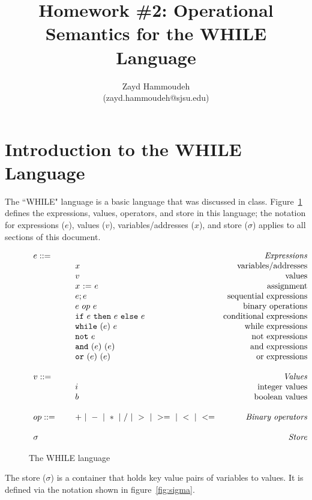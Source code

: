 \documentclass{article}
\title{Homework \#2: Operational Semantics for the WHILE Language}
\author{
  Zayd Hammoudeh \\
  (zayd.hammoudeh@sjsu.edu)
  }
\date{}
\newcommand{\rel}[1]{ \mbox{\sc [#1]} }
\newcommand{\mydefhead}[2]{\multicolumn{2}{l}{{#1}}&\mbox{\emph{#2}}\\}
\newcommand{\mydefcase}[2]{\qquad\qquad& #1 &\mbox{#2}\\}
\newcommand{\assign}[2]{#1~{:=}~#2}
\newcommand{\ife}[3]{\mbox{\tt if}~{#1}~\mbox{\tt then}~{#2}~\mbox{\tt else}~{#3}}
\newcommand{\whilee}[2]{\mbox{\tt while}~(#1)~#2}
\newcommand{\note}[1]{\mbox{\tt not}~#1}
\newcommand{\ande}[2]{\mbox{\tt and}~(#1)~(#2)}
\newcommand{\ore}[2]{\mbox{\tt or}~(#1)~(#2)}
\begin{document}
\maketitle

\section{Introduction to the WHILE Language}

The ``WHILE" language is a basic language that was discussed in class.  Figure~\ref{fig:lang} defines the expressions, values, operators, and store in this language; the notation for expressions ($e$), values ($v$), variables/addresses ($x$), and store ($\sigma$) applies to all sections of this document.

\newcommand{\ssrule}[3]{
  \rel{#1} &
  \frac{\strut\begin{array}{@{}c@{}} #2 \end{array}}
       {\strut\begin{array}{@{}c@{}} #3 \end{array}}
   \\~\\
}
\newcommand{\sstep}[4]{{#1},{#2} \rightarrow {#3},{#4}}
\newcommand{\sstepraw}[4]{{#1},{#2} \rightarrow {#3},{#4}}
\begin{figure}[H]
\caption{The WHILE language}
\label{fig:lang}
\[
\begin{array}{llr}
  \mydefhead{e ::=\qquad\qquad\qquad\qquad}{Expressions}
  \mydefcase{x}{variables/addresses}
  \mydefcase{v}{values}
  \mydefcase{\assign x e}{assignment}
  \mydefcase{e; e}{sequential expressions}
  \mydefcase{e ~op~ e}{binary operations}
  \mydefcase{\ife e e e}{conditional expressions}
  \mydefcase{\whilee e e}{while expressions}
  \mydefcase{\note e}{not expressions}
  \mydefcase{\ande e e}{and expressions}
  \mydefcase{\ore e e}{or expressions}
  \\
  \mydefhead{v ::=\qquad\qquad\qquad\qquad}{Values}
  \mydefcase{i}{integer values}
  \mydefcase{b}{boolean values}
  \\
  op ::= & + ~|~ - ~|~ * ~|~ / ~|~ > ~|~ >= ~|~ < ~|~ <=  & \mbox{\emph{Binary operators}} 
  \\
  \\
  \mydefhead{\sigma}{Store} 
\end{array}
\]
\end{figure}

The store ($\sigma$) is a container that holds key value pairs of variables to values.  It is defined via the notation shown in figure~\ref{fig:sigma}.
\end{document}
